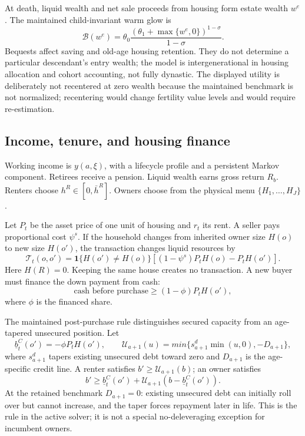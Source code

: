 \documentclass[11pt]{article}
\theoremstyle{definition}
\newcommand{\1}{\mathbf 1}
\newcommand{\Bcal}{\mathcal B}
\begin{document}
At death, liquid wealth and net sale proceeds from housing form estate wealth
$w^e$. The maintained child-invariant warm glow is
\begin{equation}
 \Bcal(w^e)
 =\theta_0\frac{(\theta_1+\max\{w^e,0\})^{1-\sigma}}
 {1-\sigma}.
 \label{eq:full_bequest}
\end{equation}
Bequests affect saving and old-age housing retention. They do not determine a
particular descendant's entry wealth; the model is intergenerational in
housing allocation and cohort accounting, not fully dynastic. The displayed
utility is deliberately not recentered at zero wealth because the maintained
benchmark is not normalized; recentering would change fertility value levels
and would require re-estimation.

\subsection{Income, tenure, and housing finance}

Working income is $y(a,\xi)$, with a lifecycle profile and a persistent Markov
component. Retirees receive a pension. Liquid wealth earns gross return $R_b$.
Renters choose $h^R\in[0,\bar h^R]$. Owners choose from the physical menu
$\{H_1,\ldots,H_J\}$.

Let $P_t$ be the asset price of one unit of housing and $r_t$ its rent. A seller
pays proportional cost $\psi^s$. If the household changes from inherited
owner size $H(o)$ to new size $H(o')$, the transaction changes liquid
resources by
\begin{equation}
 \mathcal T_t(o,o')=
 \1\{H(o')\neq H(o)\}
 \left[(1-\psi^s)P_tH(o)-P_tH(o')\right].
 \label{eq:housing_transaction}
\end{equation}
Here $H(R)=0$. Keeping the same house creates no transaction. A new buyer must
finance the down payment from cash:
\begin{equation}
 \text{cash before purchase}\geq(1-\phi)P_tH(o'),
 \label{eq:downpayment}
\end{equation}
where $\phi$ is the financed share.

The maintained post-purchase rule distinguishes secured capacity from an
age-tapered unsecured position. Let
\begin{equation}
 \underline b_t^C(o')=-\phi P_tH(o'),\qquad
 \mathcal U_{a+1}(u)=min\{s^d_{a+1}\min(u,0),-D_{a+1}\},
 \label{eq:debt_rollover}
\end{equation}
where $s^d_{a+1}$ tapers existing unsecured debt toward zero and $D_{a+1}$ is
the age-specific credit line. A renter satisfies
$b'\geq\mathcal U_{a+1}(b)$; an owner satisfies
\begin{equation}
 b'\geq \underline b_t^C(o')+
 \mathcal U_{a+1}\!\left(b-\underline b_t^C(o')\right).
 \label{eq:owner_debt_floor}
\end{equation}
At the retained benchmark $D_{a+1}=0$: existing unsecured debt can initially
roll over but cannot increase, and the taper forces repayment later in life.
This is the rule in the active solver; it is not a special no-deleveraging
exception for incumbent owners.
\end{document}
